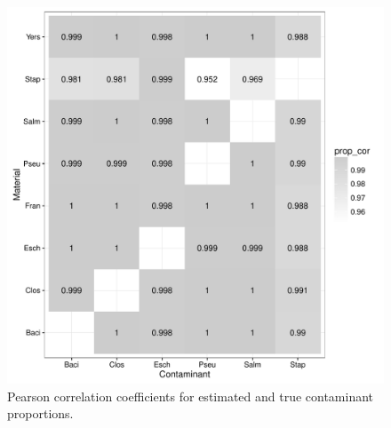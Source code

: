 \documentclass[fleqn,10pt,lineno]{wlpeerj}\usepackage[]{graphicx}\usepackage[]{color}
\makeatletter
\def\maxwidth{ %
  \ifdim\Gin@nat@width>\linewidth
    \linewidth
  \else
    \Gin@nat@width
  \fi
}
\newenvironment{knitrout}{}{} %
\makeatother
\begin{document}
\begin{knitrout}
\color{fgcolor}\begin{figure}
\includegraphics[width=\maxwidth]{figure/contam_corr-1} \caption[Pearson correlation coefficients for estimated and true contaminant proportions]{Pearson correlation coefficients for estimated and true contaminant proportions.}\label{fig:contam_corr}
\end{figure}


\end{knitrout}
\end{document}
